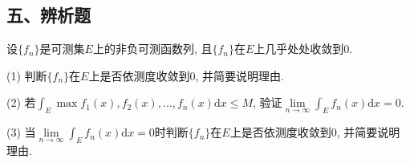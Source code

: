 \documentclass[UTF8]{article}
\begin{document}
  \subsection*{五、辨析题}

  设$\{f_n\}$是可测集$E$上的非负可测函数列, 且$\{f_n\}$在$E$上几乎处处收敛到$0$.\par
  (1) 判断$\{f_n\}$在$E$上是否依测度收敛到$0$, 并简要说明理由.\par
  (2) 若$\int_{E} \max{f_1(x),f_2(x),\ldots,f_n(x)}\mathrm{d}x\leqslant M$, 验证$\lim \limits_{n \to \infty}\int_{E}f_n(x)\mathrm{d}x=0$.\par
  (3) 当$\lim \limits_{n \to \infty}\int_{E}f_n(x)\mathrm{d}x=0$时判断$\{f_n\}$在$E$上是否依测度收敛到$0$, 并简要说明理由.\par
\end{document}
